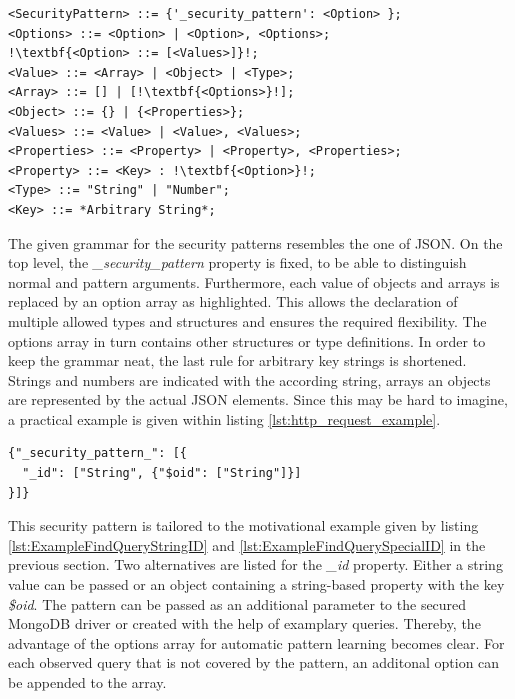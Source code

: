 \begin{lstlisting}[escapechar=!, caption={Proposed security pattern grammar for the the injection mitigation mechanism}, label={lst:http_request_example}]
<SecurityPattern> ::= {'_security_pattern': <Option> };
<Options> ::= <Option> | <Option>, <Options>;
!\textbf{<Option> ::= [<Values>]}!;
<Value> ::= <Array> | <Object> | <Type>;
<Array> ::= [] | [!\textbf{<Options>}!];
<Object> ::= {} | {<Properties>};
<Values> ::= <Value> | <Value>, <Values>;
<Properties> ::= <Property> | <Property>, <Properties>;
<Property> ::= <Key> : !\textbf{<Option>}!;
<Type> ::= "String" | "Number";
<Key> ::= *Arbitrary String*;
\end{lstlisting}

The given grammar for the security patterns resembles the one of JSON. On the top level, the \emph{\_security\_pattern} property is fixed, to be able to distinguish normal and pattern arguments. Furthermore, each value of objects and arrays is replaced by an option array as highlighted. This allows the declaration of multiple allowed types and structures and ensures the required flexibility. The options array in turn contains other structures or type definitions. In order to keep the grammar neat, the last rule for arbitrary key strings is shortened. Strings and numbers are indicated with the according string, arrays an objects are represented by the actual JSON elements. Since this may be hard to imagine, a practical example is given within listing \ref{lst:http_request_example}. \\

\begin{lstlisting}[escapechar=!, caption={Security pattern allowing string-based and object-based identifiers as a query parameter}, label={lst:http_request_example}]
{"_security_pattern_": [{
  "_id": ["String", {"$oid": ["String"]}]
}]}
\end{lstlisting}

This security pattern is tailored to the motivational example given by listing \ref{lst:ExampleFindQueryStringID} and \ref{lst:ExampleFindQuerySpecialID} in the previous section. Two alternatives are listed for the \emph{\_id} property. Either a string value can be passed or an object containing a string-based property with the key \emph{\$oid}. The pattern can be passed as an additional parameter to the secured MongoDB driver or created with the help of examplary queries. Thereby, the advantage of the options array for automatic pattern learning becomes clear. For each observed query that is not covered by the pattern, an additonal option can be appended to the array. 


